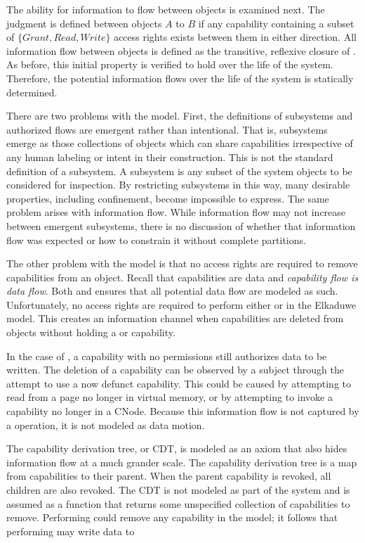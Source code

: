 The ability for information to flow between objects is examined next.
The  judgment is defined between objects \(A\) to \(B\) if any capability containing a subset of \(\{Grant, Read, Write\}\) access rights exists between them in either direction.
All information flow between objects is defined as the transitive, reflexive closure of .
As before, this initial property is verified to hold over the life of the system.
Therefore, the potential information flows over the life of the system is statically determined.

There are two problems with the model.
First, the definitions of subsystems and authorized flows are emergent rather than intentional.
That is, subsystems emerge as those collections of objects which can share capabilities irrespective of any human labeling or intent in their construction.
This is not the standard definition of a subsystem.
A subsystem is any subset of the system objects to be considered for inspection.
By restricting subsystems in this way, many desirable properties, including confinement, become impossible to express.
The same problem arises with information flow.
While information flow may not increase between emergent subsystems, there is no discussion of whether that information flow was expected or how to constrain it without complete partitions.

The other problem with the model is that no access rights are required to remove capabilities from an object.
Recall that capabilities are data and \emph{capability flow is data flow}.
Both \TMSW{} and \TMmodelName{} ensures that all potential data flow are modeled as such.
Unfortunately, no access rights are required to perform either  or  in the Elkaduwe model.
This creates an information channel when capabilities are deleted from objects without holding a  or  capability.

In the case of , a capability with no permissions still authorizes data to be written.
The deletion of a capability can be observed by a subject through the attempt to use a now defunct capability.
This could be caused by attempting to read from a page no longer in virtual memory, or by attempting to invoke a capability no longer in a CNode.
Because this information flow is not captured by a  operation, it is not modeled as data motion.

The capability derivation tree, or CDT, is modeled as an axiom that also hides information flow at a much grander scale.
The capability derivation tree is a map from capabilities to their parent.
When the parent capability is revoked, all children are also revoked.
The CDT is not modeled as part of the system and is assumed as a function that returns some unspecified collection of capabilities to remove.
Performing  could remove any capability in the model; it follows that performing  may write data to 

